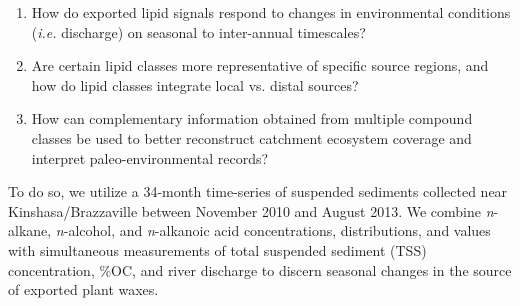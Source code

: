 \begin{enumerate}[label=(\textit{\roman*})]

\item How do exported lipid signals respond to changes in environmental conditions (\textit{i.e.} discharge) on seasonal to inter-annual timescales?
\item Are certain lipid classes more representative of specific source regions, and how do lipid classes integrate local vs. distal sources?
\item How can complementary information obtained from multiple compound classes be used to better reconstruct catchment ecosystem coverage and interpret paleo-environmental records?

\end{enumerate}

To do so, we utilize a 34-month time-series of suspended sediments collected near Kinshasa/Brazzaville between November 2010 and August 2013.  We combine \textit{n}-alkane, \textit{n}-alcohol, and \textit{n}-alkanoic acid concentrations, distributions, and  values with simultaneous measurements of total suspended sediment (TSS) concentration, \%OC, and river discharge to discern seasonal changes in the source of exported plant waxes. 

